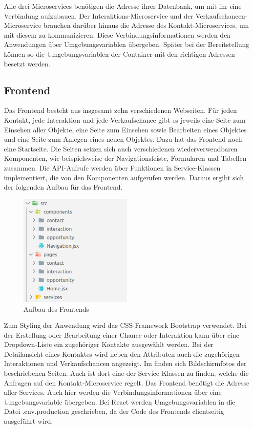 Alle drei Microservices benötigen die Adresse ihrer Datenbank, um mit ihr eine Verbindung aufzubauen. Der Interaktions-Microservice und der Verkaufschancen-Microservice brauchen darüber hinaus die Adresse des Kontakt-Microservices, um mit diesem zu kommunizieren. Diese Verbindungsinformationen werden den Anwendungen über Umgebungsvariablen übergeben. Später bei der Bereitstellung können so die Umgebungsvariablen der Container mit den richtigen Adressen besetzt werden.

\subsection{Frontend}

Das Frontend besteht aus insgesamt zehn verschiedenen Webseiten. Für jeden Kontakt, jede Interaktion und jede Verkaufschance gibt es jeweils eine Seite zum Einsehen aller Objekte, eine Seite zum Einsehen sowie Bearbeiten eines Objektes und eine Seite zum Anlegen eines neuen Objektes. Dazu hat das Frontend noch eine Startseite. Die Seiten setzen sich auch verschiedenen wiederverwendbaren Komponenten, wie beispielsweise der Navigationsleiste, Formularen und Tabellen zusammen. Die \ac{API}-Aufrufe werden über Funktionen in Service-Klassen implementiert, die von den Komponenten aufgerufen werden. Daraus ergibt sich der folgenden Aufbau für das Frontend.

\begin{figure}[H] 
    \centering
    \includegraphics[width=0.5\textwidth]{figures/AufbauFrontend.png}
    \caption{Aufbau des Frontends}
\end{figure}

Zum Styling der Anwendung wird das CSS-Framework Bootstrap verwendet. Bei der Erstellung oder Bearbeitung einer Chance oder Interaktion kann über eine Dropdown-Liste ein zugehöriger Kontakte ausgewählt werden. Bei der Detailansicht eines Kontaktes wird neben den Attributen auch die zugehörigen Interaktionen und Verkaufschancen angezeigt. Im  finden sich Bildschirmfotos der beschriebenen Seiten. Auch ist dort eine der Service-Klassen zu finden, welche die Anfragen auf den Kontakt-Microservice regelt. Das Frontend benötigt die Adresse aller Services. Auch hier werden die Verbindungsinformationen über eine Umgebungsvariable übergeben. Bei React werden Umgebungsvariablen in die Datei .env.production geschrieben, da der Code des Frontends clientseitig ausgeführt wird.

